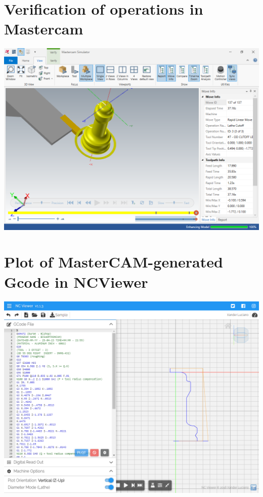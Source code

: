\documentclass{report}
\begin{document}
\chapter{Verification of operations in Mastercam}
\begin{landscape}
\vfill
\includegraphics[width=\linewidth]{img/prj05-mastercam_simulator-verification.png}
\vfill
\end{landscape}

\addtocounter{chapter}{1}


\chapter{Plot of MasterCAM-generated Gcode in NCViewer}
\begin{landscape}
\includegraphics[height=\textheight]{img/prj05-cam-gcode-ncviewer-plot-xz.png}
\end{landscape}
\end{document}
